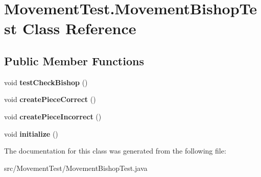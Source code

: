 \hypertarget{class_movement_test_1_1_movement_bishop_test}{\section{Movement\-Test.\-Movement\-Bishop\-Test Class Reference}
\label{class_movement_test_1_1_movement_bishop_test}
}
\subsection*{Public Member Functions}
\begin{DoxyCompactItemize}
\item 
\hypertarget{class_movement_test_1_1_movement_bishop_test_a93a4a3c215e76e1375be38853ca4a0a2}{void {\bfseries test\-Check\-Bishop} ()}\label{class_movement_test_1_1_movement_bishop_test_a93a4a3c215e76e1375be38853ca4a0a2}

\item 
\hypertarget{class_movement_test_1_1_movement_bishop_test_a4d5a76dde27feb3496d45d36d377f130}{void {\bfseries create\-Piece\-Correct} ()}\label{class_movement_test_1_1_movement_bishop_test_a4d5a76dde27feb3496d45d36d377f130}

\item 
\hypertarget{class_movement_test_1_1_movement_bishop_test_a862c0caeae649e7a3a454a441f86aba0}{void {\bfseries create\-Piece\-Incorrect} ()}\label{class_movement_test_1_1_movement_bishop_test_a862c0caeae649e7a3a454a441f86aba0}

\item 
\hypertarget{class_movement_test_1_1_movement_bishop_test_adcb77e9441c7ef262ed6ec8695a7b3b9}{void {\bfseries initialize} ()}\label{class_movement_test_1_1_movement_bishop_test_adcb77e9441c7ef262ed6ec8695a7b3b9}

\end{DoxyCompactItemize}


The documentation for this class was generated from the following file\-:\begin{DoxyCompactItemize}
\item 
src/\-Movement\-Test/Movement\-Bishop\-Test.\-java\end{DoxyCompactItemize}

